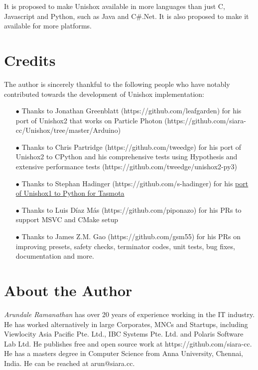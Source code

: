 \documentclass[]{article}
\begin{document}
It is proposed to make Unishox available in more languages than just C, Javascript and Python, such as Java and C\#.Net. It is also proposed to make it available for more platforms.

\section{Credits}

The author is sincerely thankful to the following people who have notably contributed towards the development of Unishox implementation:

\begin{itemize}
	\item[$\bullet$] Thanks to Jonathan Greenblatt (https://github.com/leafgarden) for his port of Unishox2 that works on Particle Photon (https://github.com/siara-cc/Unishox/tree/master/Arduino)
	\item[$\bullet$] Thanks to Chris Partridge (https://github.com/tweedge) for his port of Unishox2 to CPython and his comprehensive tests using Hypothesis and extensive performance tests (https://github.com/tweedge/unishox2-py3)
	\item[$\bullet$] Thanks to Stephan Hadinger (https://github.com/s-hadinger) for his \href{https://github.com/arendst/Tasmota/tree/development/tools/unishox}{port of Unishox1 to Python for Tasmota}
	\item[$\bullet$] Thanks to Luis Díaz Más (https://github.com/piponazo) for his PRs to support MSVC and CMake setup
	\item[$\bullet$] Thanks to James Z.M. Gao (https://github.com/gsm55) for his PRs on improving presets, safety checks, terminator codes, unit tests, bug fixes, documentation and more.
\end{itemize}

\section{About the Author}

\emph{Arundale Ramanathan} has over 20 years of experience working in the IT industry. He has worked alternatively in large Corporates, MNCs and Startups, including Viewlocity Asia Pacific Pte. Ltd., IBC Systems Pte. Ltd. and Polaris Software Lab Ltd. He publishes free and open source work at https://github.com/siara-cc. He has a masters degree in Computer Science from Anna University, Chennai, India. He can be reached at arun@siara.cc.
\end{document}
